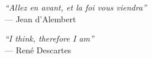 \cleardoublepage
{}
\thispagestyle{empty}

\vspace*{\fill}

\begin{center}
    \textit{``Allez en avant, et la foi vous viendra''} \\
    --- Jean d'Alembert
    
    \vspace{2cm} %
    
    \textit{``I think, therefore I am''} \\
    --- René Descartes
\end{center}

\vspace*{\fill}
\clearpage